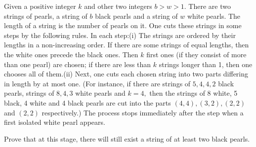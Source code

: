 Given a positive integer $k$ and other two integers $b > w > 1.$ There are two strings of pearls, a string of $b$ black pearls and a string of $w$ white pearls. The length of a string is the number of pearls on it. One cuts these strings in some steps by the following rules. In each step:(i) The strings are ordered by their lengths in a non-increasing order. If there are some strings of equal lengths, then the white ones precede the black ones. Then $k$ first ones (if they consist of more than one pearl) are chosen; if there are less than $k$ strings longer than 1, then one chooses all of them.(ii) Next, one cuts each chosen string into two parts differing in length by at most one. (For instance, if there are strings of $5, 4, 4, 2$ black pearls, strings of $8, 4, 3$ white pearls and $k = 4,$ then the strings of 8 white, 5 black, 4 white and 4 black pearls are cut into the parts $(4,4), (3,2), (2,2)$ and $(2,2)$ respectively.) The process stops immediately after the step when a first isolated white pearl appears.

Prove that at this stage, there will still exist a string of at least two black pearls.